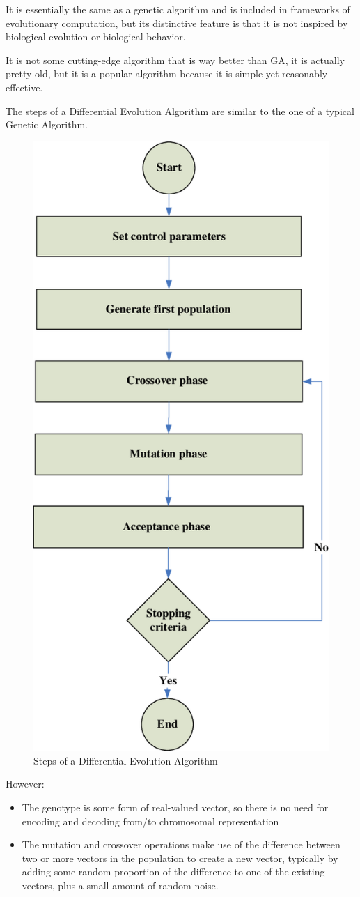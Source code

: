 \documentclass[sigconf]{acmart} %
\begin{document}
It is essentially the same as a genetic algorithm and is included in frameworks of evolutionary computation, but its distinctive feature is that it is not inspired by biological evolution or biological behavior.

It is not some cutting-edge algorithm that is way better than GA, it is actually pretty old, but it is a popular algorithm because it is simple yet reasonably effective. 

The steps of a Differential Evolution Algorithm are similar to the one of a typical Genetic Algorithm.

\begin{figure}[H]
    \centering
    \includegraphics[width = 0.5\linewidth]{pictures/Differential-evolution-algorithm-steps.png}
    \caption{\label{fig:Differential-evolution-algorithm-steps} Steps of a Differential Evolution Algorithm}
\end{figure}

However:
\begin{itemize}
    \item The genotype is some form of real-valued vector, so there is no need for encoding and decoding from/to chromosomal representation
    \item The mutation and crossover operations make use of the difference between two or more vectors in the population to create a new vector, typically by adding some random proportion of the difference to one of the existing vectors, plus a small amount of random noise.

\end{itemize}
\end{document}
